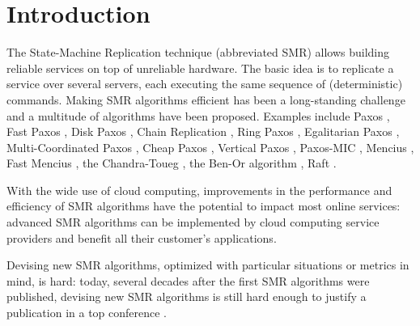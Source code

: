 \section{Introduction}

The State-Machine Replication technique (abbreviated SMR) allows
building reliable services on top of unreliable hardware. The basic idea is to 
replicate a service over several servers, each executing the same
sequence of (deterministic) commands. 
Making SMR algorithms efficient has been a long-standing
challenge and a multitude of algorithms have been proposed. Examples
include Paxos \cite{lamport2001paxos}, Fast Paxos \cite{Lamport06FastPaxos}, Disk Paxos
\cite{GafniLamport03DiskPaxos}, Chain Replication
\cite{RenesseSchneider04ChainReplicationSupportingHighThroughputAvailability},
Ring Paxos
\cite{MarandiETAL10RingPaxosHighthroughputAtomicBroadcastProtocol},
Egalitarian Paxos
\cite{MoraruAndersenKaminsky13ThereIsMoreConsensusEgalitarianParliaments},
Multi-Coordinated Paxos
\cite{CamargosSchmidtPedone07MulticoordinatedPaxos}, Cheap Paxos
\cite{LamportMassa04CheapPaxos}, Vertical Paxos
\cite{LamportMalkhiZhou09VerticalPaxosPrimarybackupReplication},
Paxos-MIC
\cite{HurfinMoiseNarzul11AdaptiveFastPaxosMakingQuickEverlasting},
Mencius
\cite{MaoJunqueiraMarzullo08MenciusBuildingEfficientReplicatedStateMachine},
Fast Mencius \cite{WeiETAL13FastMenciusMenciusLowCommitLatency}, the Chandra-Toueg \cite{ChandraToueg96UnreliableFailureDetectorsReliableDistributedSystems}, the Ben-Or algorithm \cite{BenOr83AnotherAdvantageFreeChoiceCompletelyAsynchronous}, Raft \cite{OngaroOusterhout14SearchUnderstandableConsensusAlgorithm}.

With the wide use of cloud computing, improvements in the performance and efficiency of SMR algorithms have the potential to impact most online services: advanced SMR algorithms can be implemented by cloud computing service providers and benefit all their customer's applications.

Devising new SMR algorithms, optimized with particular situations or metrics in mind, is hard: today, several decades after the first SMR algorithms \cite{Lamport98ParttimeParliament,BirmanJoseph87ReliableCommunicationPresenceFailures,OkiLiskov88ViewstampedReplicationGeneralPrimaryCopy,DworkLynchStockmeyer84ConsensusPresencePartialSynchronyPreliminaryVersion} were published, devising new SMR algorithms is still hard enough to justify a publication in a top conference \cite{MoraruAndersenKaminsky13ThereIsMoreConsensusEgalitarianParliaments,OngaroOusterhout14SearchUnderstandableConsensusAlgorithm}.

